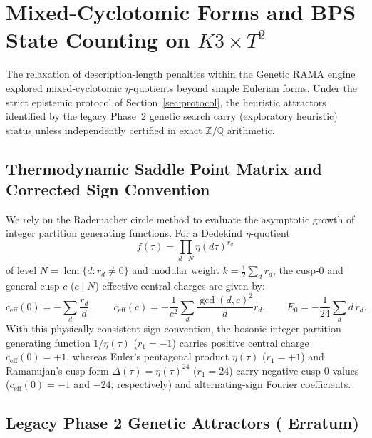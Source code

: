 \section{Mixed-Cyclotomic Forms and BPS State Counting on $K3 \times T^2$}

The relaxation of description-length penalties within the Genetic RAMA engine explored mixed-cyclotomic $\eta$-quotients beyond simple Eulerian forms. Under the strict epistemic protocol of Section~\ref{sec:protocol}, the heuristic attractors identified by the legacy Phase~2 genetic search carry \tierC{} (exploratory heuristic) status unless independently certified in exact $\mathbb{Z}/\mathbb{Q}$ arithmetic.

\subsection{Thermodynamic Saddle Point Matrix and Corrected Sign Convention}
We rely on the Rademacher circle method to evaluate the asymptotic growth of integer partition generating functions. For a Dedekind $\eta$-quotient
\begin{equation}
f(\tau) = \prod_{d \mid N} \eta(d\tau)^{r_d}
\end{equation}
of level $N = \operatorname{lcm}\{d : r_d \neq 0\}$ and modular weight $k = \frac{1}{2}\sum_d r_d$, the cusp-$0$ and general cusp-$c$ ($c \mid N$) effective central charges are given by:
\begin{equation}
c_{\text{eff}}(0) = -\sum_{d} \frac{r_d}{d}, \qquad
c_{\text{eff}}(c) = -\frac{1}{c^2} \sum_{d} \frac{\gcd(d, c)^2}{d} r_d, \qquad
E_0 = -\frac{1}{24} \sum_{d} d\, r_d.
\end{equation}
With this physically consistent sign convention, the bosonic integer partition generating function $1/\eta(\tau)$ ($r_1 = -1$) carries positive central charge $c_{\text{eff}}(0) = +1$, whereas Euler's pentagonal product $\eta(\tau)$ ($r_1 = +1$) and Ramanujan's cusp form $\Delta(\tau) = \eta(\tau)^{24}$ ($r_1 = 24$) carry negative cusp-$0$ values ($c_{\text{eff}}(0) = -1$ and $-24$, respectively) and alternating-sign Fourier coefficients.

\subsection{Legacy Phase 2 Genetic Attractors (\tierC{} Erratum)}

